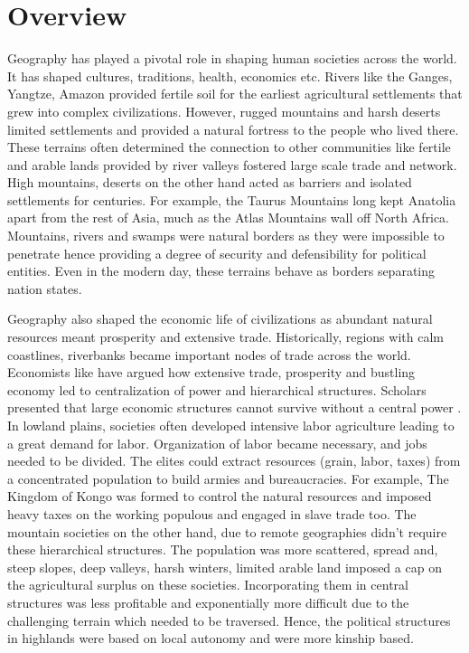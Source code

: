 \begin{sloppypar}

\section{Overview}
Geography has played a pivotal role in shaping human societies across the world. It has shaped cultures, traditions, health, economics etc. Rivers like the Ganges, Yangtze, Amazon provided fertile soil for the earliest agricultural settlements that grew into complex civilizations. However, rugged mountains and harsh deserts limited settlements and provided a natural fortress to the people who lived there. These terrains often determined the connection to other communities like fertile and arable lands provided by river valleys fostered large scale trade and network. High mountains, deserts on the other hand acted as barriers and isolated settlements for centuries. For example, the Taurus Mountains long kept Anatolia apart from the rest of Asia, much as the Atlas Mountains wall off North Africa. Mountains, rivers and swamps were natural borders as they were impossible to penetrate hence providing a degree of security and defensibility for political entities. Even in the modern day, these terrains behave as borders separating nation states. 

\vspace{0.3cm}

Geography also shaped the economic life of civilizations as abundant natural resources meant prosperity and extensive trade. Historically, regions with calm coastlines, riverbanks became important nodes of trade across the world. Economists like \cite{smith1937wealth} have argued how extensive trade, prosperity and bustling economy led to centralization of power and hierarchical structures. Scholars presented that large economic structures cannot survive without a central power \citep{robinson2012nations}. In lowland plains, societies often developed intensive labor agriculture leading to a great demand for labor. Organization of labor became necessary, and jobs needed to be divided. The elites could extract resources (grain, labor, taxes) from a concentrated population to build armies and bureaucracies. For example, The Kingdom of Kongo was formed to control the natural resources and imposed heavy taxes on the working populous and engaged in slave trade too. The mountain societies on the other hand, due to remote geographies didn't require these hierarchical structures. The population was more scattered, spread and,  steep slopes, deep valleys, harsh winters, limited arable land imposed a cap on the agricultural surplus on these societies. Incorporating them in central structures was less profitable and exponentially more difficult due to the challenging terrain which needed to be traversed. Hence, the political structures in highlands were based on local autonomy and were more kinship based.


\end{sloppypar}
